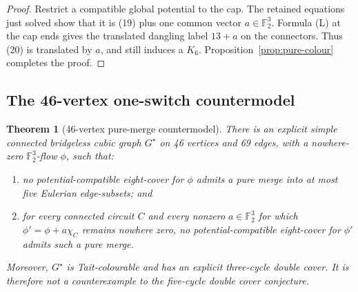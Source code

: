 \documentclass[11pt]{article}
\newtheorem{theorem}{Theorem}[section]
\theoremstyle{definition}
\theoremstyle{remark}
\newcommand{\F}{\mathbb F}
\begin{document}
\begin{proof}
Restrict a compatible global potential to the cap.  The retained
equations just solved show that it is (19) plus one common vector
\(a\in\F_2^3\).  Formula (L) at the cap ends gives the translated dangling
label \(13+a\) on the connectors.  Thus (20) is translated by \(a\), and
still induces a \(K_6\).  Proposition~\ref{prop:pure-colour} completes
the proof.
\end{proof}

\subsection{The 46-vertex one-switch countermodel}

\begin{theorem}[46-vertex pure-merge countermodel]
\label{thm:puremerge}
There is an explicit simple connected bridgeless cubic graph \(G^\star\)
on 46 vertices and 69 edges, with a nowhere-zero
\(\F_2^3\)-flow \(\phi\), such that:
\begin{enumerate}
  \item no potential-compatible eight-cover for \(\phi\) admits a pure merge
        into at most five Eulerian edge-subsets; and
  \item for every connected circuit \(C\) and every nonzero
        \(a\in\F_2^3\) for which
        \(\phi'=\phi+a\chi_C\) remains nowhere zero, no
        potential-compatible eight-cover for \(\phi'\) admits such a pure
        merge.
\end{enumerate}
Moreover, \(G^\star\) is Tait-colourable and has an explicit
three-cycle double cover.  It is therefore not a counterexample to the
five-cycle double cover conjecture.
\end{theorem}
\end{document}
